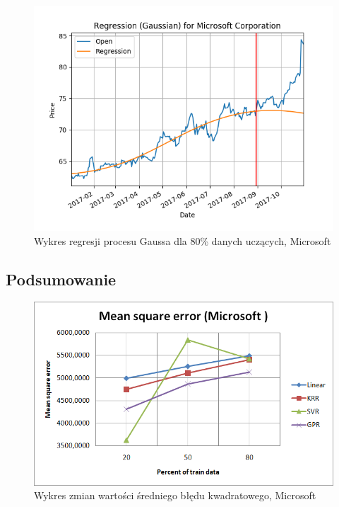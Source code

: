 \begin{figure}[h!]
\centering
\includegraphics[width=150mm]{pictures/plots/microsoft_gpr_80.png}
\caption{Wykres regresji procesu Gaussa dla 80\% danych uczących, Microsoft}
\label{fig:Wykres regresji procesu Gaussa nośnych dla 80\% danych uczących, Microsoft}
\end{figure}

\subsection{Podsumowanie}

\begin{figure}[h!]
\centering
\includegraphics[width=150mm]{pictures/plots/microsoft_mean_square.png}
\caption{Wykres zmian wartości średniego błędu kwadratowego, Microsoft}
\label{fig:Wykres zmian wartości średniego błędu kwadratowego, Microsoft}
\end{figure}

